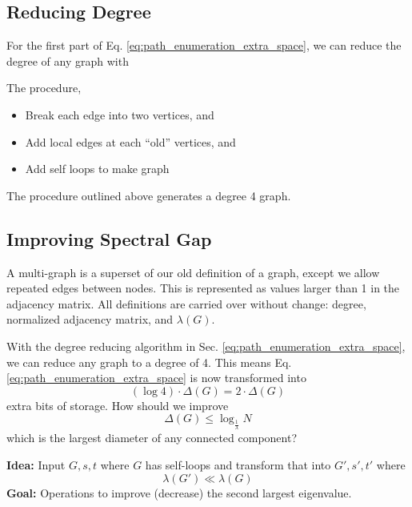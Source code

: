 \documentclass[11pt, letter]{book}
\begin{document}
\subsection{Reducing Degree} \label{sec:reducing_degree}
For the first part of Eq. \ref{eq:path_enumeration_extra_space}, we can reduce the degree of any graph with

\begin{algorithm} The procedure, 
	\begin{itemize}
		\item Break each edge into two vertices, and 
		\item Add local edges at each ``old'' vertices, and
		\item Add self loops to make graph
	\end{itemize}
\end{algorithm}

\begin{proposition}
	The procedure outlined above generates a degree 4 graph. 
\end{proposition}


\subsection{Improving Spectral Gap}
\begin{definition}
	A multi-graph is a superset of our old definition of a graph, except we allow repeated edges between nodes. This is represented as values larger than 1 in the adjacency matrix. All definitions are carried over without change: degree, normalized adjacency matrix, and $\lambda (G)$.
\end{definition}

With the degree reducing algorithm in Sec. \ref{eq:path_enumeration_extra_space}, we can reduce any graph to a degree of 4. This means Eq. \ref{eq:path_enumeration_extra_space} is now transformed into
\begin{equation}
	( \log 4 ) \cdot \Delta (G) = 2 \cdot \Delta (G)
\end{equation}
extra bits of storage. How should we improve
\begin{equation}
	\Delta (G) \leq \log _{\frac{1}{\lambda}} N
\end{equation}
which is the largest diameter of any connected component?

\begin{mdframed}
	\textbf{Idea:} Input $G, s, t$ where $G$ has self-loops and transform that into $G', s', t'$ where 
	\begin{equation}
		\lambda (G') \ll \lambda (G)
	\end{equation}
	\textbf{Goal:} Operations to improve (decrease) the second largest eigenvalue. 
\end{mdframed}
\end{document}
